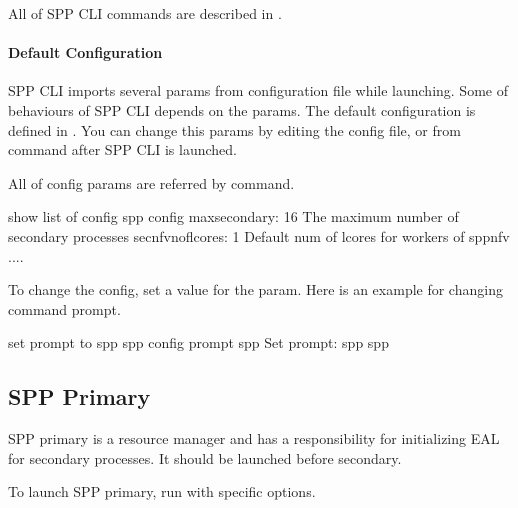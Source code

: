 \documentclass[a4paper,11pt,openany,oneside,english]{sphinxmanual}
\begin{document}
All of SPP CLI commands are described in {\hyperref[\detokenize{commands/index::doc}]{}}.


\paragraph{Default Configuration}
\label{\detokenize{gsg/howto_use:default-configuration}}
SPP CLI imports several params from configuration file while launching.
Some of behaviours of SPP CLI depends on the params.
The default configuration is defined in
.
You can change this params by editing the config file, or from 
command after SPP CLI is launched.

All of config params are referred by  command.

\begin{sphinxVerbatim}[commandchars=\\\{\},formatcom=\footnotesize]
\PYGZsh{} show list of config
spp \PYGZgt{} config
\PYGZhy{} max\PYGZus{}secondary: \PYGZdq{}16\PYGZdq{}       \PYGZsh{} The maximum number of secondary processes
\PYGZhy{} sec\PYGZus{}nfv\PYGZus{}nof\PYGZus{}lcores: \PYGZdq{}1\PYGZdq{}   \PYGZsh{} Default num of lcores for workers of spp\PYGZus{}nfv
....
\end{sphinxVerbatim}

To change the config, set a value for the param.
Here is an example for changing command prompt.

\begin{sphinxVerbatim}[commandchars=\\\{\},formatcom=\footnotesize]
\PYGZsh{} set prompt to \PYGZdq{}\PYGZdl{} spp \PYGZdq{}
spp \PYGZgt{} config prompt \PYGZdq{}\PYGZdl{} spp \PYGZdq{}
Set prompt: \PYGZdq{}\PYGZdl{} spp \PYGZdq{}
\PYGZdl{} spp
\end{sphinxVerbatim}


\subsection{SPP Primary}
\label{\detokenize{gsg/howto_use:spp-primary}}\label{\detokenize{gsg/howto_use:spp-gsg-howto-pri}}
SPP primary is a resource manager and has a responsibility for
initializing EAL for secondary processes. It should be launched before
secondary.

To launch SPP primary, run  with specific options.
\end{document}
